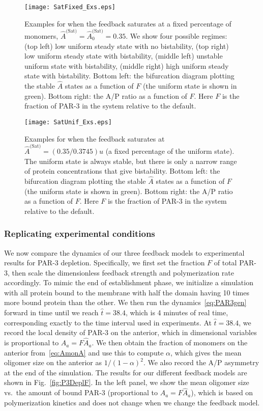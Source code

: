 \documentclass[11pt]{article}
\newcommand{\6}[1]{#1_{\text{6}}}
\newcommand{\3}[1]{#1_{\text{3}}}
\newcommand{\Sat}[1]{#1^\text{(Sat)}}
\begin{document}
\begin{figure}
\centering
\texttt{[image: SatFixed\_Exs.eps]}
\caption{\label{fig:SatSameEx}Examples for when the feedback saturates at a fixed percentage of monomers, $\Sat{\hat A}=\Sat{\hat A}_0=0.35$. We show four possible regimes: (top left) low uniform steady state with no bistability, (top right) low uniform steady state with bistability, (middle left) unstable uniform state with bistability, (middle right) high uniform steady state with bistability. Bottom left: the bifurcation diagram plotting the stable $\hat A$ states as a function of $F$ (the uniform state is shown in green). Bottom right: the A/P ratio as a function of $F$. Here $F$ is the fraction of PAR-3 in the system relative to the default. }
\end{figure}

\begin{figure}
\centering
\texttt{[image: SatUnif\_Exs.eps]}
\caption{\label{fig:SatUnifEx}Examples for when the feedback saturates at $\Sat{\hat A}=(0.35/0.3745)u$ (a fixed percentage of the uniform state). The uniform state is always stable, but there is only a narrow range of protein concentrations that give bistability. Bottom left: the bifurcation diagram plotting the stable $\hat A$ states as a function of $F$ (the uniform state is shown in green). Bottom right: the A/P ratio as a function of $F$. Here $F$ is the fraction of PAR-3 in the system relative to the default.  }
\end{figure}

\subsubsection{Replicating experimental conditions}
We now compare the dynamics of our three feedback models to experimental results for PAR-3 depletion. Specifically, we first set the fraction $F$ of total PAR-3, then scale the dimensionless feedback strength and polymerization rate accordingly. To mimic the end of establishment phase, we initialize a simulation with all protein bound to the membrane with half the domain having 10 times more bound protein than the other. We then run the dynamics\ \eqref{eq:PAR3gen} forward in time until we reach $\hat t = 38.4$, which is 4 minutes of real time, corresponding exactly to the time interval used in experiments. At $\hat t = 38.4$, we record the local density of PAR-3 on the anterior, which in dimensional variables is proportional to $A_a=F \hat A_a$. We then obtain the fraction of monomers on the anterior from\ \eqref{eq:AmonA} and use this to compute $\alpha$, which gives the mean oligomer size on the anterior as $1/(1-\alpha)^2$. We also record the A/P asymmetry at the end of the simulation. The results for our different feedback models are shown in Fig.\ \ref{fig:P3DeplF}. In the left panel, we show the mean oligomer size vs.\ the amount of bound PAR-3 (proportional to $A_a=F \hat A_a$), which is based on polymerization kinetics and does not change when we change the feedback model.
\end{document}
